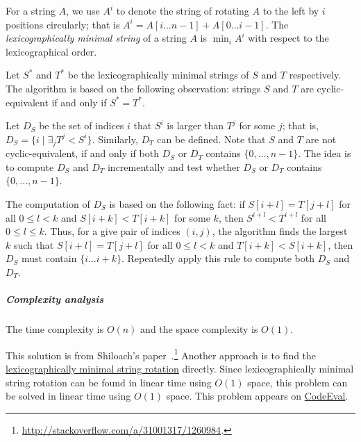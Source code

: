\begin{Answer}
For a string $A$, we use $A^i$ to denote the string of rotating $A$ to the left by $i$ positions circularly; that is $A^i = A[i \dots n - 1] + A[0 \dots i - 1]$.
The \emph{lexicographically minimal string} of a string $A$ is $\min_i A^i$ with respect to the lexicographical order.

Let $S^*$ and $T^*$ be the lexicographically minimal strings of $S$ and $T$ respectively.
The algorithm is based on the following observation:
strings $S$ and $T$ are cyclic-equivalent if and only if $S^* = T^*$.

Let $D_S$ be the set of indices $i$ that $S^i$ is larger than $T^j$ for some $j$; that is, $D_S = \{ i \mid \exists_j T^j < S^i \}$.
Similarly, $D_T$ can be defined.
Note that $S$ and $T$ are not cyclic-equivalent, if and only if both $D_S$ or $D_T$ contains $\{0, \dots, n - 1\}$.
The idea is to compute $D_S$ and $D_T$ incrementally and test whether $D_S$ or $D_T$ contains $\{0, \dots, n - 1\}$.

The computation of $D_S$ is based on the following fact: if $S[i + l] = T[j + l]$ for all $0 \leq l < k $ and $S[i + k] < T[i + k]$ for some $k$, then $S^{i + l} < T^{i + l}$ for all $0 \leq l \leq k$.
Thus, for a give pair of indices $(i, j)$, the algorithm finds the largest $k$ such that $S[i + l] = T[j + l]$ for all $0 \leq l < k $ and $T[i + k] < S[i + k]$, then $D_S$ must contain $\{ i \dots i + k\}$.
Repeatedly apply this rule to compute both $D_S$ and $D_T$.

\subparagraph{Complexity analysis} The time complexity is $O(n)$ and the space complexity is $O(1)$.

\begin{remark}
This solution is from Shiloach's paper~\cite{Shiloach1979}.\footnote{\url{http://stackoverflow.com/a/31001317/1260984}.}
Another approach is to find the \href{https://en.wikipedia.org/wiki/Lexicographically_minimal_string_rotation}{lexicographically minimal string rotation} directly.
Since lexicographically minimal string rotation can be found in linear time using $O(1)$ space, this problem can be solved in linear time using $O(1)$ space.
This problem appears on \href{https://www.codeeval.com/open_challenges/76/}{CodeEval}.
\end{remark}
\end{Answer}

